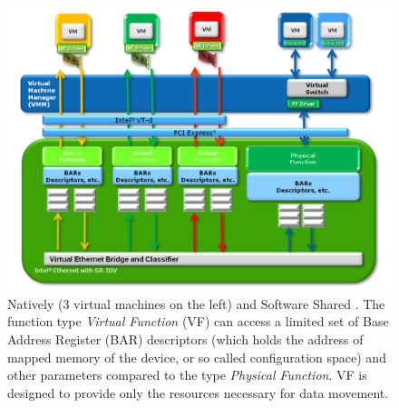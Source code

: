 \begin{figure}[H]
	\centering
	\includegraphics[width=1.0\textwidth]{resources/images/intel_sriov_Natively_and_Software_Shared.PNG}
	\caption{Natively (3 virtual machines on the left) and Software Shared \cite{intel_sriov}. The function type \textit{Virtual Function} (VF) can access a limited set of Base Address Register (BAR) descriptors (which holds the address of mapped memory of the device, or so called configuration space) and other parameters compared to the type \textit{Physical Function}. VF is designed to provide only the resources necessary for data movement.}
    \label{fig:related_work:intel_sriov_Natively_and_Software_Shared}
\end{figure}







